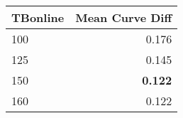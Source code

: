 \begin{tabular}{lr}
\toprule
TBonline & Mean Curve Diff \\
\midrule
100 & 0.176 \\
125 & 0.145 \\
150 & \bfseries 0.122 \\
160 & 0.122 \\
\bottomrule
\end{tabular}
